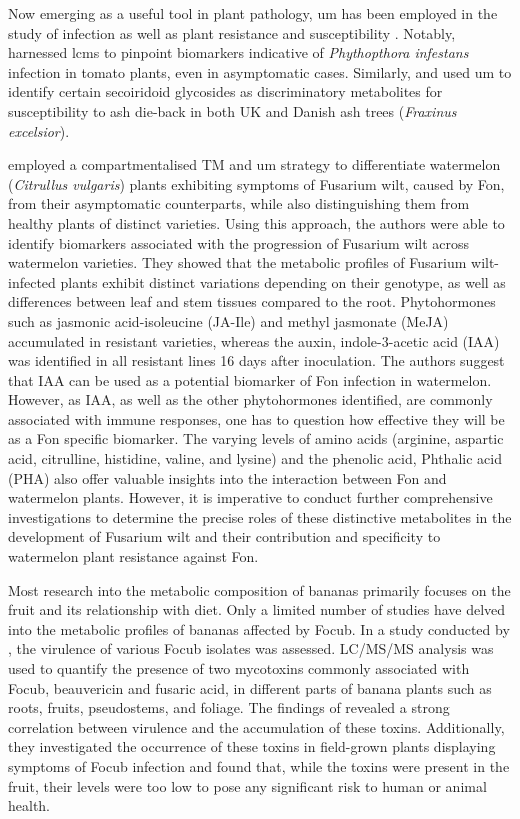 Now emerging as a useful tool in plant pathology, \ac{um} has been employed in the study of infection as well as plant resistance and susceptibility \parencite{Allwood2021}. Notably, \textcite{Garcia2018} harnessed \acf{lcms} to pinpoint biomarkers indicative of \textit{Phythopthora infestans} infection in tomato plants, even in asymptomatic cases. Similarly, \textcite{Sambles2017} and \textcite{Sidda2020} used \ac{um} to identify certain secoiridoid glycosides as discriminatory metabolites for susceptibility to ash die-back in both UK and Danish ash trees (\textit{Fraxinus excelsior}).

\textcite{Kasote2020} employed a compartmentalised TM and \ac{um} strategy to differentiate watermelon (\textit{Citrullus vulgaris}) plants exhibiting symptoms of Fusarium wilt, caused by \acf{Fon}, from their asymptomatic counterparts, while also distinguishing them from healthy plants of distinct varieties. Using this approach, the authors were able to identify biomarkers associated with the progression of Fusarium wilt across watermelon varieties. They showed that the metabolic profiles of Fusarium wilt-infected plants exhibit distinct variations depending on their genotype, as well as differences between leaf and stem tissues compared to the root. Phytohormones such as jasmonic acid-isoleucine (JA-Ile) and methyl jasmonate (MeJA) accumulated in resistant varieties, whereas the auxin, indole-3-acetic acid (IAA) was identified in all resistant lines 16 days after inoculation. The authors suggest that IAA can be used as a potential biomarker of \ac{Fon} infection in watermelon. However, as IAA, as well as the other phytohormones identified, are commonly associated with immune responses, one has to question how effective they will be as a \ac{Fon} specific biomarker. The varying levels of amino acids (arginine, aspartic acid, citrulline, histidine, valine, and lysine) and the phenolic acid, Phthalic acid (PHA) also offer valuable insights into the interaction between \ac{Fon} and watermelon plants. However, it is imperative to conduct further comprehensive investigations to determine the precise roles of these distinctive metabolites in the development of Fusarium wilt and their contribution and specificity to watermelon plant resistance against \ac{Fon}.

Most research into the metabolic composition of bananas primarily focuses on the fruit and its relationship with diet. Only a limited number of studies have delved into the metabolic profiles of bananas affected by \ac{Focub}. In a study conducted by \textcite{Li2013c}, the virulence of various \ac{Focub} isolates was assessed. LC/MS/MS analysis was used to quantify the presence of two mycotoxins commonly associated with \ac{Focub}, beauvericin and fusaric acid, in different parts of banana plants such as roots, fruits, pseudostems, and foliage. The findings of \textcite{Li2013c} revealed a strong correlation between virulence and the accumulation of these toxins. Additionally, they investigated the occurrence of these toxins in field-grown plants displaying symptoms of \ac{Focub} infection and found that, while the toxins were present in the fruit, their levels were too low to pose any significant risk to human or animal health.

